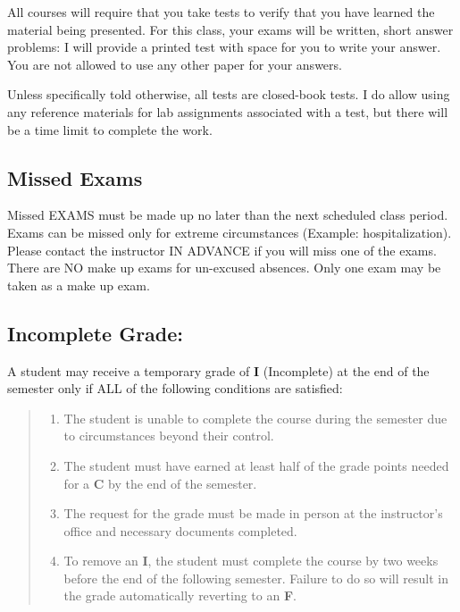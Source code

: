 \documentclass[a4paper]{article}
\begin{document}
All courses will require that you take tests to verify that you have learned
the material being presented. For this class, your exams will be written, short
answer problems: I will provide a printed test with space for you to write your
answer. You are not allowed to use any other paper for your answers.

Unless specifically told otherwise, all tests are closed-book tests. I do allow
using any reference materials for lab assignments associated with a test, but
there will be a time limit to complete the work.


\subsection{Missed Exams%
  \label{missed-exams}%
}

Missed EXAMS must be made up no later than the next scheduled class period.
Exams can be missed only for extreme circumstances (Example: hospitalization).
Please contact the instructor IN ADVANCE if you will miss one of the exams.
There are NO make up exams for un-excused absences. Only one exam may be taken
as a make up exam.


\subsection{Incomplete Grade:%
  \label{incomplete-grade}%
}

A student may receive a temporary grade of \textbf{I} (Incomplete) at the end of
the semester only if ALL of the following conditions are satisfied:
%
\begin{quote}
\begin{enumerate}

\item The student is unable to complete the course during the semester due to
circumstances beyond their control.

\item The student must have earned at least half of the grade points needed
for a \textbf{C} by the end of the semester.

\item The request for the grade must be made in person at the instructor's
office and necessary documents completed.

\item To remove an \textbf{I}, the student must complete the course by two weeks
before the end of the following semester. Failure to do so will result
in the grade automatically reverting to an \textbf{F}.
\end{enumerate}

\end{quote}
\end{document}
